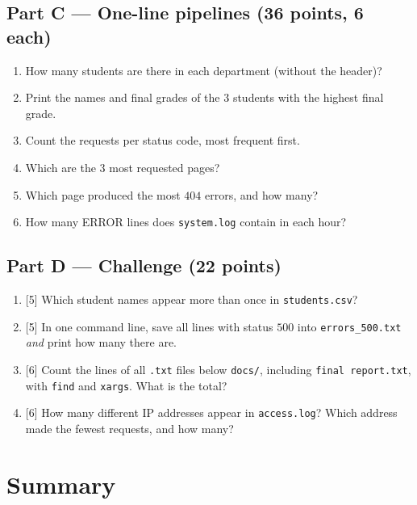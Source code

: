 \documentclass[11pt,a4paper]{article}
\newcommand{\cmd}[1]{\texttt{#1}}
\begin{document}
\subsection*{Part C --- One-line pipelines (36 points, 6 each)}
\begin{enumerate}[leftmargin=2.2em,label=\textbf{C\arabic*}]
  \item How many students are there in each department (without the header)?
  \item Print the names and final grades of the $3$ students with the highest final grade.
  \item Count the requests per status code, most frequent first.
  \item Which are the $3$ most requested pages?
  \item Which page produced the most $404$ errors, and how many?
  \item How many ERROR lines does \texttt{system.log} contain in each hour?
\end{enumerate}

\subsection*{Part D --- Challenge (22 points)}
\begin{enumerate}[leftmargin=2.2em,label=\textbf{D\arabic*}]
  \item {[5]} Which student names appear more than once in \texttt{students.csv}?
  \item {[5]} In one command line, save all lines with status $500$ into \texttt{errors\_500.txt} \emph{and} print how many there are.
  \item {[6]} Count the lines of all \texttt{.txt} files below \texttt{docs/}, including \texttt{final report.txt}, with \cmd{find} and \cmd{xargs}. What is the total?
  \item {[6]} How many different IP addresses appear in \texttt{access.log}? Which address made the fewest requests, and how many?
\end{enumerate}

\section{Summary}
\end{document}
